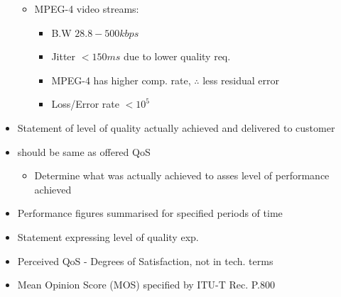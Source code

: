 \documentclass[a4paper]{article}
\begin{document}
\begin{itemize}
\begin{itemize}
\begin{itemize}
		\end{itemize}
		\item MPEG-4 video streams:
		\begin{itemize}
			\item B.W $28.8-500kbps$
			\item Jitter $<150ms$ due to lower quality req.
			\item MPEG-4 has higher comp. rate, $\therefore$ less
				residual error
			\item Loss/Error rate $<10^5$
		\end{itemize}
	\end{itemize}
	\item Statement of level of quality actually achieved and delivered to
		customer
	\item should be same as offered QoS
	\begin{itemize}
		\item Determine what was actually achieved to asses level of
			performance achieved
	\end{itemize}
	\item Performance figures summarised for specified periods of time
\end{itemize}
\begin{itemize}
	\item Statement expressing level of quality exp.
	\item Perceived QoS - Degrees of Satisfaction, not in tech. terms
	\item Mean Opinion Score (MOS) specified by ITU-T Rec. P.800
\end{itemize}
\end{document}
